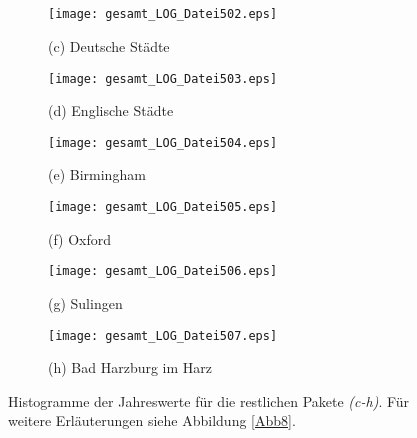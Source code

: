 \documentclass[fontsize=11pt, twoside, a4paper]{scrartcl}
\begin{document}
\begin{verbatim}



\end{verbatim}

\begin{figure}[H]
	\begin{minipage}[t]{0.45\textwidth}
		\begin{figure}[H]
		\texttt{[image: gesamt\_LOG\_Datei502.eps]}
		\caption*{(c) Deutsche Städte}
		\end{figure}
	\end{minipage}	
	\begin{minipage}[t]{0.45\textwidth}
		\begin{figure}[H]
		\texttt{[image: gesamt\_LOG\_Datei503.eps]}
		\caption*{(d) Englische Städte}
		\end{figure}
	\end{minipage}

		\begin{minipage}[t]{0.45\textwidth}
		\begin{figure}[H]
		\texttt{[image: gesamt\_LOG\_Datei504.eps]}
		\caption*{(e) Birmingham}
		\end{figure}
	\end{minipage}	
	\begin{minipage}[t]{0.45\textwidth}
		\begin{figure}[H]
		\texttt{[image: gesamt\_LOG\_Datei505.eps]}
		\caption*{(f) Oxford}
		\end{figure}
	\end{minipage}

	\begin{minipage}[t]{0.45\textwidth}
		\begin{figure}[H]
		\texttt{[image: gesamt\_LOG\_Datei506.eps]}
		\caption*{(g) Sulingen}
		\end{figure}
	\end{minipage}	
	\begin{minipage}[t]{0.45\textwidth}
		\begin{figure}[H]
		\texttt{[image: gesamt\_LOG\_Datei507.eps]}
		\caption*{(h) Bad Harzburg im Harz}
		\end{figure}
	\end{minipage}
\caption{Histogramme der Jahreswerte für die restlichen Pakete \textit{(c-h)}. Für weitere Erläuterungen siehe Abbildung \ref{Abb8}.}
\end{figure}
\end{document}
